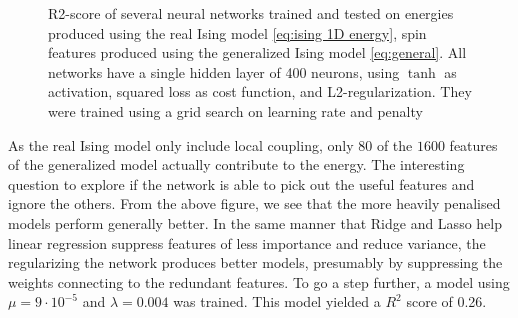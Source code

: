 \begin{figure}[H]
\centering
{}
\qquad
{}
\caption{R2-score of several neural networks trained and tested on energies produced using the real Ising model \autoref{eq:ising 1D energy}, spin features produced using the generalized Ising model \autoref{eq:general}. All networks have a single hidden layer of 400 neurons, using $\tanh$ as activation, squared loss as cost function, and L2-regularization. They were trained using a grid search on learning rate and penalty}
\label{fig:NN_reg}
\end{figure}

As the real Ising model only include local coupling, only $80$ of the $1600$ features of the generalized model actually contribute to the energy. The interesting question to explore if the network is able to pick out the useful features and ignore the others. From the above figure, we see that the more heavily penalised models perform generally better. In the same manner that Ridge and Lasso help linear regression suppress features of less importance and reduce variance, the regularizing the network produces better models, presumably by suppressing the weights connecting to the redundant features. To go a step further, a model using $\mu = 9 \cdot 10^{-5}$ and $\lambda = 0.004$ was trained. This model yielded a $R^2$ score of 0.26. 

